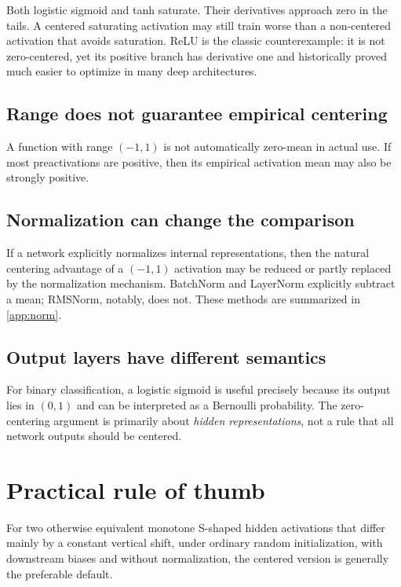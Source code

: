 \documentclass[11pt]{article}
\begin{document}
Both logistic sigmoid and tanh saturate.  Their derivatives approach zero in the tails.  A centered saturating activation may still train worse than a non-centered activation that avoids saturation.  ReLU is the classic counterexample: it is not zero-centered, yet its positive branch has derivative one and historically proved much easier to optimize in many deep architectures.

\subsection{Range does not guarantee empirical centering}

A function with range \((-1,1)\) is not automatically zero-mean in actual use.  If most preactivations are positive, then its empirical activation mean may also be strongly positive.

\subsection{Normalization can change the comparison}

If a network explicitly normalizes internal representations, then the natural centering advantage of a \((-1,1)\) activation may be reduced or partly replaced by the normalization mechanism.  BatchNorm and LayerNorm explicitly subtract a mean; RMSNorm, notably, does not.  These methods are summarized in \cref{app:norm}.

\subsection{Output layers have different semantics}

For binary classification, a logistic sigmoid is useful precisely because its output lies in \((0,1)\) and can be interpreted as a Bernoulli probability.  The zero-centering argument is primarily about \emph{hidden representations}, not a rule that all network outputs should be centered.

\section{Practical rule of thumb}

For two otherwise equivalent monotone S-shaped hidden activations that differ mainly by a constant vertical shift, under ordinary random initialization, with downstream biases and without normalization, the centered version is generally the preferable default.
\end{document}
